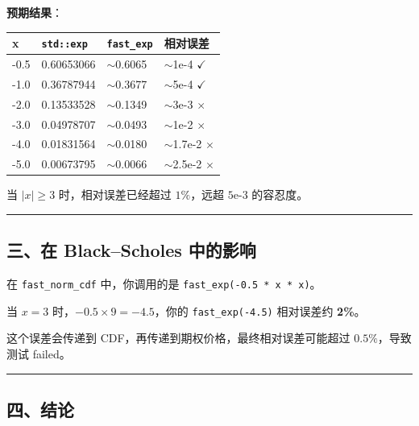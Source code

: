 \documentclass[11pt, a4paper]{article}
\begin{document}
\begin{aibox}
\textbf{预期结果}：

\begin{tcolorbox}[colback=white,colframe=gray!50!white,boxrule=0.5pt,arc=2pt,left=5pt,right=5pt,top=5pt,bottom=5pt]
\vspace{0.5em}
\begin{tabularx}{\textwidth}{@{} l l l X @{}}
\toprule
x & \texttt{std::exp} & \texttt{fast\_exp} & 相对误差 \\
\midrule
-0.5 & 0.60653066 & $\sim$0.6065 & $\sim$1e-4 $\checkmark$ \\
-1.0 & 0.36787944 & $\sim$0.3677 & $\sim$5e-4 $\checkmark$ \\
-2.0 & 0.13533528 & $\sim$0.1349 & $\sim$3e-3 $\times$ \\
-3.0 & 0.04978707 & $\sim$0.0493 & $\sim$1e-2 $\times$ \\
-4.0 & 0.01831564 & $\sim$0.0180 & $\sim$1.7e-2 $\times$ \\
-5.0 & 0.00673795 & $\sim$0.0066 & $\sim$2.5e-2 $\times$ \\
\bottomrule
\end{tabularx}
\vspace{0.5em}
\end{tcolorbox}

当 $|x| \ge 3$ 时，相对误差已经超过 $1\%$，远超 $5\text{e-}3$ 的容忍度。

\begin{center}\rule{\textwidth}{0.4pt}\end{center}

\subsection*{三、在 Black–Scholes 中的影响}

在 \texttt{fast\_norm\_cdf} 中，你调用的是 \texttt{fast\_exp(-0.5 * x * x)}。

当 $x = 3$ 时，$-0.5 \times 9 = -4.5$，你的 \texttt{fast\_exp(-4.5)} 相对误差约 \textbf{2\%}。

这个误差会传递到 CDF，再传递到期权价格，最终相对误差可能超过 $0.5\%$，导致测试 failed。

\begin{center}\rule{\textwidth}{0.4pt}\end{center}

\subsection*{四、结论}


\end{aibox}
\end{document}
